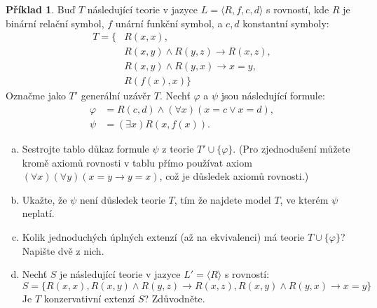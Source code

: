 \documentclass[a4paper]{article}
\theoremstyle{plain}
\theoremstyle{definition}
\newtheorem{problem}{Příklad}
\begin{document}
\medskip\begin{problem} 
Buď $T$ následující teorie v jazyce $L=\langle R,f,c,d\rangle$ s rovností, kde $R$ je binární relační symbol,  $f$ unární funkční symbol, a $c,d$ konstantní symboly:
\begin{align*}
    T=\{&R(x,x),\\
        &R(x,y)\wedge R(y,z)\to R(x,z),\\
        &R(x,y)\wedge R(y,x)\to x=y,\\
        &R(f(x),x)\}
\end{align*}
Označme jako $T'$ generální uzávěr $T$. Nechť $\varphi$ a $\psi$ jsou následující formule:
\begin{align*}
    \varphi &= R(c,d) \wedge (\forall x)(x=c\vee x=d),\\
    \psi &= (\exists x)R(x,f(x)).
\end{align*}
\begin{enumerate}[(a)]
    \item Sestrojte tablo důkaz formule $\psi$ z teorie $T'\cup\{\varphi\}$. (Pro zjednodušení můžete kromě axiomů rovnosti v tablu přímo používat axiom $(\forall x)(\forall y)(x=y\to y=x)$, což je důsledek axiomů rovnosti.)
    \item Ukažte, že $\psi$ není důsledek teorie $T$, tím že najdete model $T$, ve kterém $\psi$ neplatí.
    \item Kolik jednoduchých úplných extenzí (až na ekvivalenci) má teorie $T\cup \{\varphi\}$? Napište dvě z nich.
    \item Nechť $S$ je následující teorie v jazyce $L'=\langle R\rangle$ s rovností:
     $$S=\{R(x,x),R(x,y)\wedge R(y,z)\to R(x,z),R(x,y)\wedge R(y,x)\to x=y\}$$
     Je $T$ konzervativní extenzí $S$? Zdůvodněte.
\end{enumerate}
\end{problem}
\end{document}
